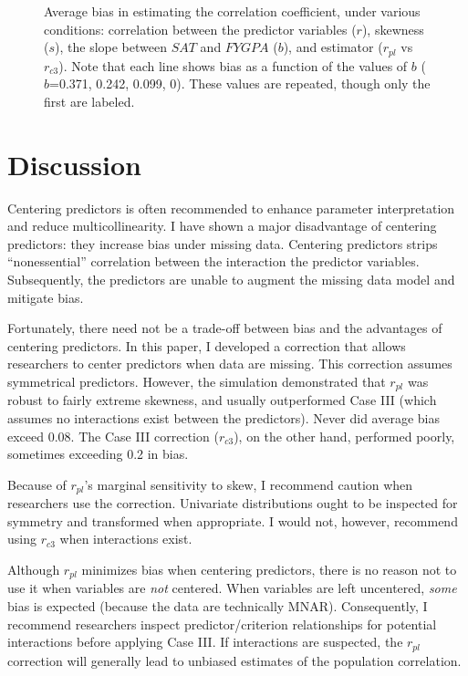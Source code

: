 \documentclass[english,man]{apa6}
\theoremstyle{definition}
\theoremstyle{definition}
\theoremstyle{remark}
\begin{document}
\begin{figure}[htbp]
\begin{center}
\caption{Average bias in estimating the correlation coefficient, under various conditions: correlation between the predictor variables ($r$), skewness ($s$), the slope between $SAT$ and $FYGPA$ ($b$), and estimator ($r_{pl}$ vs $r_{c3}$). Note that each line shows bias as a function of the values of $b$ ($b$=0.371, 0.242, 0.099, 0). These values are repeated, though only the first are labeled.}
\label{fig:results}
\end{center}
\end{figure}

\section{Discussion}\label{discussion}

Centering predictors is often recommended to enhance parameter
interpretation and reduce multicollinearity. I have shown a major
disadvantage of centering predictors: they increase bias under missing
data. Centering predictors strips \enquote{nonessential} correlation
between the interaction the predictor variables. Subsequently, the
predictors are unable to augment the missing data model and mitigate
bias.

Fortunately, there need not be a trade-off between bias and the
advantages of centering predictors. In this paper, I developed a
correction that allows researchers to center predictors when data are
missing. This correction assumes symmetrical predictors. However, the
simulation demonstrated that \(r_{pl}\) was robust to fairly extreme
skewness, and usually outperformed Case III (which assumes no
interactions exist between the predictors). Never did average bias
exceed 0.08. The Case III correction (\(r_{c3}\)), on the other hand,
performed poorly, sometimes exceeding 0.2 in bias.

Because of \(r_{pl}\)'s marginal sensitivity to skew, I recommend
caution when researchers use the correction. Univariate distributions
ought to be inspected for symmetry and transformed when appropriate. I
would not, however, recommend using \(r_{c3}\) when interactions exist.

Although \(r_{pl}\) minimizes bias when centering predictors, there is
no reason not to use it when variables are \emph{not} centered. When
variables are left uncentered, \emph{some} bias is expected (because the
data are technically MNAR). Consequently, I recommend researchers
inspect predictor/criterion relationships for potential interactions
before applying Case III. If interactions are suspected, the \(r_{pl}\)
correction will generally lead to unbiased estimates of the population
correlation.
\end{document}
